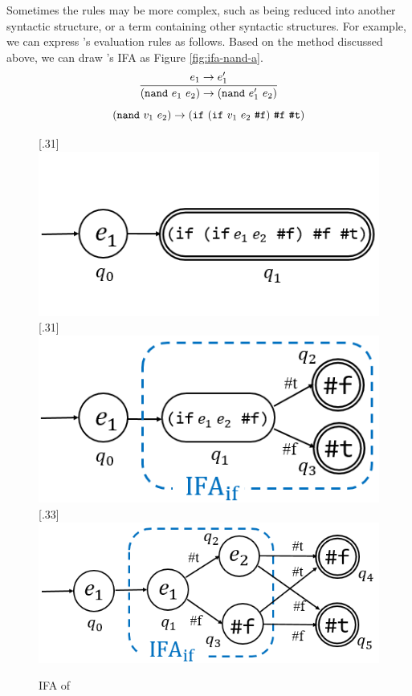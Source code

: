 \begin{example}

Sometimes the rules may be more complex, such as being reduced into another syntactic structure, or a term containing other syntactic structures. For example, we can express 's evaluation rules as follows. Based on the method discussed above, we can draw 's IFA as Figure \ref{fig:ifa-nand-a}.
\[
    \infer{(\m{nand}~e_1~e_2) \to (\m{nand}~e_1'~e_2)}{e_1 \to e_1'}
\]\[
    (\mbox{\tt nand}~v_1~e_2) \to (\mbox{\tt if}~(\mbox{\tt if}~v_1~e_2~\mbox{\tt \#f})~\mbox{\tt \#f}~\mbox{\tt \#t})
\]


\begin{figure}[t]
    \centering
    [.31\linewidth]{
        \includegraphics[scale=0.25]{images/ifa/ifa-nand-1-small.png}
    }
    [.31\linewidth]{
        \includegraphics[scale=0.25]{images/ifa/ifa-nand-2-small.png}
    }
    [.33\linewidth]{
        \includegraphics[scale=0.25]{images/ifa/ifa-nand-3-small.png}
    }
    \caption{IFA of }
    \label{fig:ifa-nand}
\end{figure}


\end{example}
